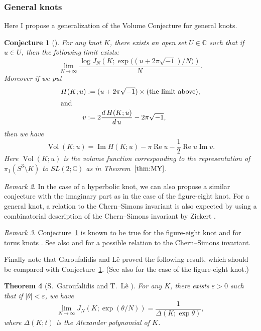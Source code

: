 \documentclass{amsart}
\newcommand{\C}{\mathbb{C}}
\newcommand{\Vol}{\operatorname{Vol}}
\renewcommand{\Re}{\operatorname{Re}}
\renewcommand{\Im}{\operatorname{Im}}
\newtheorem{theorem}{Theorem}[section]
\newtheorem{conjecture}[theorem]{Conjecture}
\theoremstyle{definition}
\theoremstyle{remark}
\newtheorem{remark}[theorem]{Remark}
\numberwithin{equation}{section}
\begin{document}
\subsubsection{General knots}
Here I propose a generalization of the Volume Conjecture for general knots.
\begin{conjecture}[\cite{Murakami:ADVAM22007}]\label{conj:PVC}
For any knot $K$, there exists an open set $U\in\C$ such that if $u\in U$, then the following limit exists:
\begin{equation*}
  \lim_{N\to\infty}
  \frac{\log J_N(K;\exp\bigl((u+2\pi\sqrt{-1})/N\bigr))}{N}.
\end{equation*}
Moreover if we put
\begin{align*}
  H(K;u)&:=(u+2\pi\sqrt{-1})\times(\text{the limit above}),
  \\
  \intertext{and}
  v&:=2\dfrac{d\,H(K;u)}{d\,u}-2\pi\sqrt{-1},
\end{align*}
then we have
\begin{equation*}
  \Vol(K;u)
  =
  \Im{H(K;u)}
  -\pi\Re{u}
  -\frac{1}{2}\Re{u}\Im{v}.
\end{equation*}
Here $\Vol(K;u)$ is the volume function corresponding to the representation of $\pi_1(S^3\setminus{K})$ to $SL(2;\C)$ as in Theorem~$\ref{thm:MY}$.
\end{conjecture}
\begin{remark}
In the case of a hyperbolic knot, we can also propose a similar conjecture with the imaginary part as in the case of the figure-eight knot.
For a general knot, a relation to the Chern--Simons invariant is also expected by using a combinatorial description of the Chern--Simons invariant by Zickert \cite{Zickert:DUKMJ2009}.
\end{remark}
\begin{remark}
Conjecture~\ref{conj:PVC} is known to be true for the figure-eight knot \cite{Murakami/Yokota:JREIA2007} and for torus knots \cite{Murakami:ADVAM22007}.
See also \cite{Murakami:ACTMV2008} and \cite{Hikami/Murakami:Bonn} for a possible relation to the Chern--Simons invariant.
\end{remark}
Finally note that Garoufalidis and L{\^e} proved the following result, which should be compared with Conjecture~\ref{conj:PVC}.
(See also \cite{Murakami:JPJGT2007} for the case of the figure-eight knot.)
\begin{theorem}[S.~Garoufalidis and T.~L{\^e} \cite{Garoufalidis/Le:aMMR}]
For any $K$, there exists $\varepsilon>0$ such that if $|\theta|<\varepsilon$, we have
\begin{equation*}
  \lim_{N\to\infty}
  J_N(K;\exp(\theta/N))
  =
  \frac{1}{\Delta(K;\exp{\theta})},
\end{equation*}
where $\Delta(K;t)$ is the Alexander polynomial of $K$.
\end{theorem}


\end{document}
